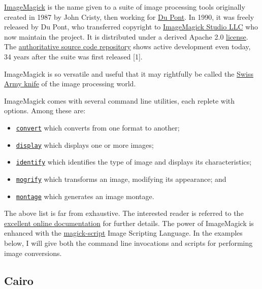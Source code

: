 \documentclass[
  11pt,
  british,
  a4paper,
]{article}
\providecommand{\tightlist}{%
  \setlength{\itemsep}{0pt}\setlength{\parskip}{0pt}}
\begin{document}
\href{https://imagemagick.org/index.php}{ImageMagick} is the name given
to a suite of image processing tools originally created in 1987 by John
Cristy, then working for \href{https://www.dupont.com/}{Du Pont}. In
1990, it was freely released by Du Pont, who transferred copyright to
\href{https://imagemagick.org/script/contact.php}{ImageMagick Studio
LLC} who now maintain the project. It is distributed under a derived
Apache 2.0 \href{https://imagemagick.org/script/license.php}{license}.
The \href{https://github.com/ImageMagick/ImageMagick}{authoritative
source code repository} shows active development even today, 34 years
after the suite was first released {[}1{]}.

ImageMagick is so versatile and useful that it may rightfully be called
the \href{https://www.thefreedictionary.com/Swiss-army+knife}{Swiss Army
knife} of the image processing world.

ImageMagick comes with several command line utilities, each replete with
options. Among these are:

\begin{itemize}
\tightlist
\item
  \href{https://imagemagick.org/script/convert.php}{\texttt{convert}}
  which converts from one format to another;
\item
  \href{https://imagemagick.org/script/display.php}{\texttt{display}}
  which displays one or more images;
\item
  \href{https://imagemagick.org/script/identify.php}{\texttt{identify}}
  which identifies the type of image and displays its characteristics;
\item
  \href{https://imagemagick.org/script/mogrify.php}{\texttt{mogrify}}
  which transforms an image, modifying its appearance; and
\item
  \href{https://imagemagick.org/script/montage.php}{\texttt{montage}}
  which generates an image montage.
\end{itemize}

The above list is far from exhaustive. The interested reader is referred
to the
\href{https://imagemagick.org/script/command-line-tools.php}{excellent
online documentation} for further details. The power of ImageMagick is
enhanced with the
\href{https://imagemagick.org/script/magick-script.php}{magick-script}
Image Scripting Language. In the examples below, I will give both the
command line invocations and scripts for performing image conversions.

\hypertarget{cairo}{%
\subsection{Cairo}\label{cairo}}
\end{document}
